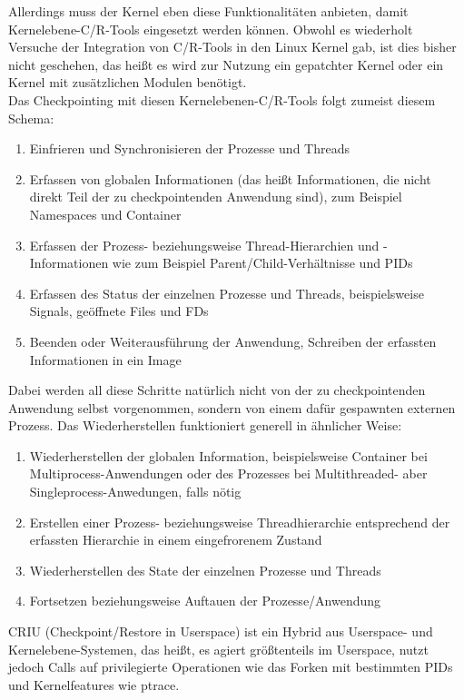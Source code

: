 \documentclass[a4paper]{article}
\begin{document}
Allerdings muss der Kernel eben diese Funktionalitäten anbieten, damit Kernelebene-C/R-Tools eingesetzt werden können. Obwohl es wiederholt Versuche der Integration von C/R-Tools in den Linux Kernel gab, ist dies bisher nicht geschehen, das heißt es wird zur Nutzung ein gepatchter Kernel oder ein Kernel mit zusätzlichen Modulen benötigt.\\
Das Checkpointing mit diesen Kernelebenen-C/R-Tools folgt zumeist diesem Schema:
\begin{enumerate}
    \item Einfrieren und Synchronisieren der Prozesse und Threads
    \item Erfassen von globalen Informationen (das heißt Informationen, die nicht direkt Teil der zu checkpointenden Anwendung sind), zum Beispiel Namespaces und Container
    \item Erfassen der Prozess- beziehungsweise Thread-Hierarchien und -Informa\-tionen wie zum Beispiel Parent/Child-Verhältnisse und PIDs
    \item Erfassen des Status der einzelnen Prozesse und Threads, beispielsweise Signals, geöffnete Files und FDs
    \item Beenden oder Weiterausführung der Anwendung, Schreiben der erfassten Informationen in ein Image
\end{enumerate}
Dabei werden all diese Schritte natürlich nicht von der zu checkpointenden Anwendung selbst vorgenommen, sondern von einem dafür gespawnten externen Prozess. Das Wiederherstellen funktioniert generell in ähnlicher Weise:
\begin{enumerate}
    \item Wiederherstellen der globalen Information, beispielsweise Container bei Multiprocess-Anwendungen oder des Prozesses bei Multithreaded- aber Singleprocess-Anwedungen, falls nötig
    \item Erstellen einer Prozess- beziehungsweise Threadhierarchie entsprechend der erfassten Hierarchie in einem eingefrorenem Zustand
    \item Wiederherstellen des State der einzelnen Prozesse und Threads
    \item Fortsetzen beziehungsweise Auftauen der Prozesse/Anwendung
\end{enumerate}
CRIU\cite{CRIU} (Checkpoint/Restore in Userspace) ist ein Hybrid aus Userspace- und Kernelebene-Systemen, das heißt, es agiert größtenteils im Userspace, nutzt jedoch Calls auf privilegierte Operationen wie das Forken mit bestimmten PIDs und Kernelfeatures wie ptrace.
\end{document}
